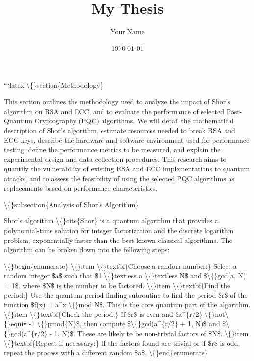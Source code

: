 \documentclass{article}
\title{My Thesis}
\author{Your Name}
\date{\today}
\begin{document}
\maketitle

```latex
\textbackslash\{\}section\{Methodology\}

This section outlines the methodology used to analyze the impact of Shor's algorithm on RSA and ECC, and to evaluate the performance of selected Post-Quantum Cryptography (PQC) algorithms. We will detail the mathematical description of Shor's algorithm, estimate resources needed to break RSA and ECC keys, describe the hardware and software environment used for performance testing, define the performance metrics to be measured, and explain the experimental design and data collection procedures. This research aims to quantify the vulnerability of existing RSA and ECC implementations to quantum attacks, and to assess the feasibility of using the selected PQC algorithms as replacements based on performance characteristics.

\textbackslash\{\}subsection\{Analysis of Shor's Algorithm\}

Shor's algorithm \textbackslash\{\}cite\{Shor\} is a quantum algorithm that provides a polynomial-time solution for integer factorization and the discrete logarithm problem, exponentially faster than the best-known classical algorithms. The algorithm can be broken down into the following steps:

\textbackslash\{\}begin\{enumerate\}
    \textbackslash\{\}item \textbackslash\{\}textbf\{Choose a random number:\} Select a random integer \$a\$ such that \$1 \textbackslash\{\}textless a \textbackslash\{\}textless N\$ and \$\textbackslash\{\}gcd(a, N) = 1\$, where \$N\$ is the number to be factored.
    \textbackslash\{\}item \textbackslash\{\}textbf\{Find the period:\} Use the quantum period-finding subroutine to find the period \$r\$ of the function \$f(x) = a\textasciicircum{}x \textbackslash\{\}mod N\$. This is the core quantum part of the algorithm.
    \textbackslash\{\}item \textbackslash\{\}textbf\{Check the period:\} If \$r\$ is even and \$a\textasciicircum{}\{r/2\} \textbackslash\{\}not\textbackslash\{\}equiv -1 \textbackslash\{\}pmod\{N\}\$, then compute \$\textbackslash\{\}gcd(a\textasciicircum{}\{r/2\} + 1, N)\$ and \$\textbackslash\{\}gcd(a\textasciicircum{}\{r/2\} - 1, N)\$. These are likely to be non-trivial factors of \$N\$.
    \textbackslash\{\}item \textbackslash\{\}textbf\{Repeat if necessary:\} If the factors found are trivial or if \$r\$ is odd, repeat the process with a different random \$a\$.
\textbackslash\{\}end\{enumerate\}
\end{document}
